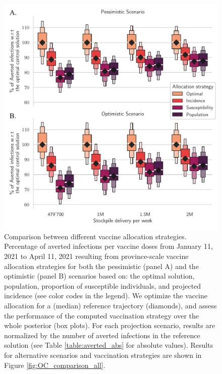 \begin{figure}[!ht]
    \centering
    \includegraphics[width=\textwidth]{fig_italy-ocp/figures/scenarios_perturb_all.pdf}
    \caption[Comparison between different vaccine allocation strategies]{Comparison between different vaccine allocation strategies. Percentage of averted infections per vaccine doses from January 11, 2021 to April 11, 2021 resulting from province-scale vaccine allocation strategies for both the pessimistic (panel A) and the optimistic (panel B) scenarios based on: the optimal solution, population, proportion of susceptible individuals, and projected incidence (see color codes in the legend). We optimize the vaccine allocation for a (median) reference trajectory (diamonds), and assess the performance of the computed vaccination strategy over the whole posterior (box plots). For each projection scenario, results are normalized by the number of averted infections in the reference solution (see Table \ref{table:averted_abs} for absolute values). Results for alternative scenarios and vaccination strategies are shown in Figure \ref{fig:OC_comparison_all}.}
    \label{fig:OC_comparison}
\end{figure}
